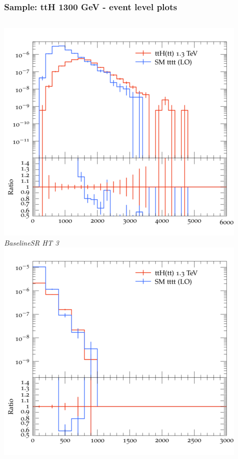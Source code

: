 \documentclass{beamer}
\begin{document}
\begin{frame}
\frametitle{Sample: ttH 1300 GeV - event level plots}
\begin{columns}
\includegraphics[width=\textwidth]{../plots/ttH_1300/tttt_ttH_1LOS/BaselineSR_HT_3.png}\\
\textit{\small BaselineSR HT 3}
\includegraphics[width=\textwidth]{../plots/ttH_1300/tttt_ttH_1LOS/BaselineSR_MET.png}\\

\end{columns}
\end{frame}
\end{document}
